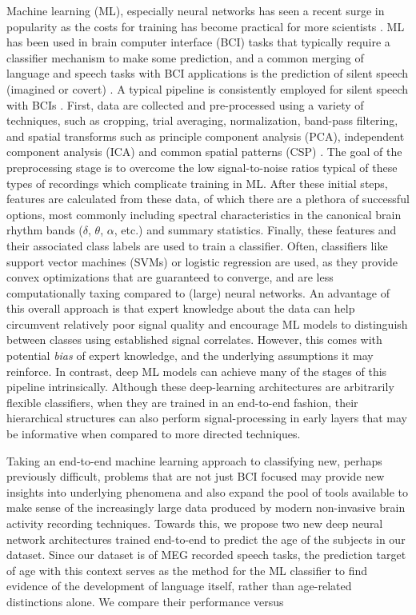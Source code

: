 \documentclass[fleqn,10pt]{wlscirep}
\begin{document}
Machine learning (ML), especially neural networks has seen a recent surge in popularity as the costs for training has become practical for more scientists \cite{LeCun2015}. ML has been used in brain computer interface (BCI) tasks that typically require a classifier mechanism to make some prediction, and a common merging of language and speech tasks with BCI applications is the prediction of silent speech (imagined or covert) \cite{Sereshkeh2017, Guimaraes2007, Zhao2015a}. A typical pipeline is consistently employed for silent speech with BCIs \cite{RezaeiTabar2016}. First, data are collected and pre-processed using a variety of techniques, such as cropping, trial averaging, normalization, band-pass filtering, and spatial transforms such as principle component analysis (PCA), independent component analysis (ICA) and common spatial patterns (CSP) \cite{Muller-Gerking1999}. The goal of the preprocessing stage is to overcome the low signal-to-noise ratios typical of these types of recordings which complicate training in ML. After these initial steps, features are calculated from these data, of which there are a plethora of successful options, most commonly including spectral characteristics in the canonical brain rhythm bands ($\delta$, $\theta$, $\alpha$, etc.) and summary statistics. Finally, these features and their associated class labels are used to train a classifier. Often, classifiers like support vector machines (SVMs) or logistic regression are used, as they provide convex optimizations that are guaranteed to converge, and are less computationally taxing compared to (large) neural networks. An advantage of this overall approach is that expert knowledge about the data can help circumvent relatively poor signal quality and encourage ML models to distinguish between classes using established signal correlates. However, this comes with potential \emph{bias} of expert knowledge, and the underlying assumptions it may reinforce. In contrast, deep ML models can achieve many of the stages of this pipeline intrinsically. Although these deep-learning architectures are arbitrarily flexible classifiers, when they are trained in an end-to-end fashion, their hierarchical structures can also perform signal-processing in early layers that may be informative when compared to more directed techniques.

Taking an end-to-end machine learning approach to classifying new, perhaps previously difficult, problems that are not just BCI focused may provide new insights into underlying phenomena and also expand the pool of tools available to make sense of the increasingly large data produced by modern non-invasive brain activity recording techniques. Towards this, we propose two new deep neural network architectures trained end-to-end to predict the age of the subjects in our dataset. Since our dataset is of MEG recorded speech tasks, the prediction target of age with this context serves as the method for the ML classifier to find evidence of the development of language itself, rather than age-related distinctions alone. We compare their performance versus 
\end{document}
